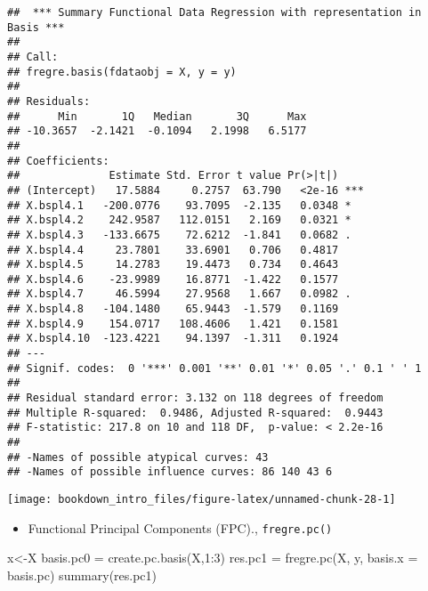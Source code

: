 \documentclass[
]{book}
\newenvironment{Shaded}{\begin{snugshade}}{\end{snugshade}}
\newcommand{\AttributeTok}[1]{\textcolor[rgb]{0.77,0.63,0.00}{#1}}
\newcommand{\DecValTok}[1]{\textcolor[rgb]{0.00,0.00,0.81}{#1}}
\newcommand{\FunctionTok}[1]{\textcolor[rgb]{0.00,0.00,0.00}{#1}}
\newcommand{\NormalTok}[1]{#1}
\newcommand{\OtherTok}[1]{\textcolor[rgb]{0.56,0.35,0.01}{#1}}
\newcommand{\SpecialCharTok}[1]{\textcolor[rgb]{0.00,0.00,0.00}{#1}}
\providecommand{\tightlist}{%
  \setlength{\itemsep}{0pt}\setlength{\parskip}{0pt}}
\begin{document}
\begin{verbatim}
##  *** Summary Functional Data Regression with representation in Basis *** 
## 
## Call:
## fregre.basis(fdataobj = X, y = y)
## 
## Residuals:
##      Min       1Q   Median       3Q      Max 
## -10.3657  -2.1421  -0.1094   2.1998   6.5177 
## 
## Coefficients:
##              Estimate Std. Error t value Pr(>|t|)    
## (Intercept)   17.5884     0.2757  63.790   <2e-16 ***
## X.bspl4.1   -200.0776    93.7095  -2.135   0.0348 *  
## X.bspl4.2    242.9587   112.0151   2.169   0.0321 *  
## X.bspl4.3   -133.6675    72.6212  -1.841   0.0682 .  
## X.bspl4.4     23.7801    33.6901   0.706   0.4817    
## X.bspl4.5     14.2783    19.4473   0.734   0.4643    
## X.bspl4.6    -23.9989    16.8771  -1.422   0.1577    
## X.bspl4.7     46.5994    27.9568   1.667   0.0982 .  
## X.bspl4.8   -104.1480    65.9443  -1.579   0.1169    
## X.bspl4.9    154.0717   108.4606   1.421   0.1581    
## X.bspl4.10  -123.4221    94.1397  -1.311   0.1924    
## ---
## Signif. codes:  0 '***' 0.001 '**' 0.01 '*' 0.05 '.' 0.1 ' ' 1
## 
## Residual standard error: 3.132 on 118 degrees of freedom
## Multiple R-squared:  0.9486, Adjusted R-squared:  0.9443 
## F-statistic: 217.8 on 10 and 118 DF,  p-value: < 2.2e-16
## 
## -Names of possible atypical curves: 43 
## -Names of possible influence curves: 86 140 43 6
\end{verbatim}

\begin{center}\texttt{[image: bookdown\_intro\_files/figure-latex/unnamed-chunk-28-1]} \end{center}

\begin{itemize}
\tightlist
\item
  Functional Principal Components (FPC).\citep{Cardot_1999}, \texttt{fregre.pc()}
\end{itemize}

\begin{Shaded}
\begin{Highlighting}[]
\NormalTok{x}\OtherTok{\textless{}{-}}\NormalTok{X}
\NormalTok{basis.pc0 }\OtherTok{=} \FunctionTok{create.pc.basis}\NormalTok{(X,}\DecValTok{1}\SpecialCharTok{:}\DecValTok{3}\NormalTok{)}
\NormalTok{res.pc1 }\OtherTok{=} \FunctionTok{fregre.pc}\NormalTok{(X, y, }\AttributeTok{basis.x =}\NormalTok{ basis.pc)}
\FunctionTok{summary}\NormalTok{(res.pc1)}
\end{Highlighting}
\end{Shaded}
\end{document}

